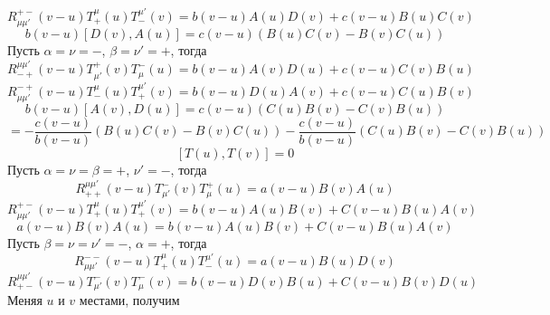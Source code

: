 \documentclass[12pt]{article}
\theoremstyle{definition}
\begin{document}
\begin{enumerate}
\begin{itemize}
        \begin{equation}
            R^{+-}_{\mu\mu'}(v-u)T^\mu_+(u)T^{\mu'}_-(v)=b(v-u)A(u)D(v)+c(v-u)B(u)C(v)
        \end{equation}
        \begin{equation}
            b(v-u)[D(v),A(u)]=c(v-u)(B(u)C(v)-B(v)C(u))
        \end{equation}
        Пусть $\alpha=\nu=-$, $\beta=\nu'=+$, тогда
        \begin{equation}
            R^{\mu\mu'}_{-+}(v-u)T^+_{\mu'}(v)T^-_\mu(u)=b(v-u)A(v)D(u)+c(v-u)C(v)B(u)
        \end{equation}
        \begin{equation}
            R^{-+}_{\mu\mu'}(v-u)T^\mu_-(u)T^{\mu'}_+(v)=b(v-u)D(u)A(v)+c(v-u)C(u)B(v)
        \end{equation}
        \begin{equation}
            b(v-u)[A(v),D(u)]=c(v-u)(C(u)B(v)-C(v)B(u))
        \end{equation}
        \begin{equation*}
            [T(u),T(v)]=-\frac{c(v-u)}{b(v-u)}(B(u)C(v)-B(v)C(u))-\frac{c(v-u)}{b(v-u)}(C(u)B(v)-C(v)B(u))
        \end{equation*}
        \begin{equation}
            \boxed{[T(u),T(v)]=0}
        \end{equation}
        Пусть $\alpha=\nu=\beta=+$, $\nu'=-$, тогда
        \begin{equation}
            R^{\mu\mu'}_{++}(v-u)T^-_{\mu'}(v)T^+_\mu(u)=a(v-u)B(v)A(u)
        \end{equation}
        \begin{equation}
            R^{+-}_{\mu\mu'}(v-u)T^\mu_+(u)T^{\mu'}_+(v)=b(v-u)A(u)B(v)+C(v-u)B(u)A(v)
        \end{equation}
        \begin{equation}
            \boxed{a(v-u)B(v)A(u)=b(v-u)A(u)B(v)+C(v-u)B(u)A(v)}
        \end{equation}
        Пусть $\beta=\nu=\nu'=-$, $\alpha=+$, тогда
        \begin{equation}
            R^{--}_{\mu\mu'}(v-u)T^\mu_+(u)T^{\mu'}_-(u)=a(v-u)B(u)D(v)
        \end{equation}
        \begin{equation}
            R^{\mu\mu'}_{+-}(v-u)T^-_{\mu'}(v)T^-_\mu(v)=b(v-u)D(v)B(u)+C(v-u)B(v)D(u)
        \end{equation}
        Меняя $u$ и $v$ местами, получим

\end{itemize}
\end{enumerate}
\end{document}
